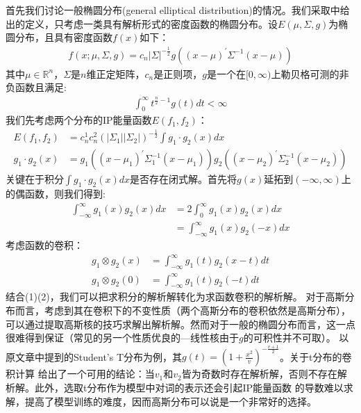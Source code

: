 \documentclass[13pt]{article}
\begin{document}
首先我们讨论一般椭圆分布(general elliptical distribution)的情况。我们采取\cite{gomez2003survey}中给出的定义，只考虑一类具有解析形式的密度函数的椭圆分布。设$E(\mu,\Sigma,g)$为椭圆分布，且具有密度函数$f(x)$如下：
\begin{align*}
f(x;\mu,\Sigma,g)=c_n|\Sigma|^{-\frac{1}{2}}g((x-\mu)^{\prime{}}\Sigma^{-1}(x-\mu))
\end{align*}
其中$\mu\in\mathbb{R}^n$，$\Sigma$是$n$维正定矩阵，$c_n$是正则项，$g$是一个在$[0,\infty)$上勒贝格可测的非负函数且满足:
\begin{align*}
\int_0^{\infty}t^{\frac{n}{2}-1}g(t)dt<\infty
\end{align*}
我们先考虑两个分布的IP能量函数$E(f_1,f_2)$：
\begin{align*}
E(f_1,f_2)&=c_n^1c_n^2(|\Sigma_1||\Sigma_2|)^{-\frac{1}{2}}\int g_1\cdot g_2(x)dx \\
g_1 \cdot g_2(x)&=g_1((x-\mu_1)^{\prime{}}\Sigma_1^{-1}(x-\mu_1))g_2((x-\mu_2)^{\prime{}}\Sigma_2^{-1}(x-\mu_2))
\end{align*}
关键在于积分$\int g_1\cdot g_2(x)dx$是否存在闭式解。首先将$g(x)$延拓到$(-\infty,\infty)$上的偶函数，则我们得到:
\begin{align*}
\int_{-\infty}^{\infty}g_1(x)g_2(x)dx&=2\int_{0}^{\infty}g_1(x)g_2(x)dx \\
&=\int_{-\infty}^{\infty}g_1(x)g_2(-x)dx
\end{align*}
考虑函数的卷积：
\begin{align*}
g_1\otimes g_2(x)&= \int_{-\infty}^{\infty} g_1(t)g_2(x-t)dt \\
g_1\otimes g_2(0)&= \int_{-\infty}^{\infty} g_1(t)g_2(-t)dt   
\end{align*}
结合(1)(2)，我们可以把求积分的解析解转化为求函数卷积的解析解。
对于高斯分布而言，考虑到其在卷积下的不变性质（两个高斯分布的卷积依然是高斯分布），可以通过提取高斯核的技巧求解出解析解。然而对于一般的椭圆分布而言，这一点很难得到保证（常见的另一个性质优良的---线性核由于$g$的可积性并不可取）。
以原文章中提到的Student's T分布为例，其$g(t)=(1+\frac{x^2}{v})^{-\frac{v+1}{2}}$。关于t分布的卷积计算
\cite{nadarajah2005convolutions}给出了一个可用的结论：当$v_1$和$v_2$皆为奇数时存在解析解，否则不存在解析解。此外，选取t分布作为模型中对词的表示还会引起IP能量函数
的导数难以求解，提高了模型训练的难度，因而高斯分布可以说是一个非常好的选择。\\
\end{document}
